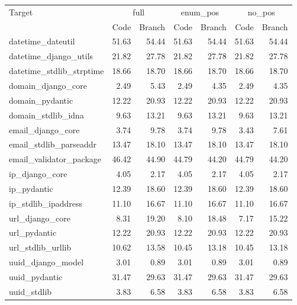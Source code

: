 \begin{tabular}{lrrrrrr}
\toprule
Target & \multicolumn{2}{c}{full} & \multicolumn{2}{c}{enum\_pos} & \multicolumn{2}{c}{no\_pos} \\
 & Code & Branch & Code & Branch & Code & Branch \\
\midrule
datetime\_dateutil & 51.63 & 54.44 & 51.63 & 54.44 & 51.63 & 54.44 \\
datetime\_django\_utils & 21.82 & 27.78 & 21.82 & 27.78 & 21.82 & 27.78 \\
datetime\_stdlib\_strptime & 18.66 & 18.70 & 18.66 & 18.70 & 18.66 & 18.70 \\
domain\_django\_core & 2.49 & 5.43 & 2.49 & 4.35 & 2.49 & 4.35 \\
domain\_pydantic & 12.22 & 20.93 & 12.22 & 20.93 & 12.22 & 20.93 \\
domain\_stdlib\_idna & 9.63 & 13.21 & 9.63 & 13.21 & 9.63 & 13.21 \\
email\_django\_core & 3.74 & 9.78 & 3.74 & 9.78 & 3.43 & 7.61 \\
email\_stdlib\_parseaddr & 13.47 & 18.10 & 13.47 & 18.10 & 13.47 & 18.10 \\
email\_validator\_package & 46.42 & 44.90 & 44.79 & 44.20 & 44.79 & 44.20 \\
ip\_django\_core & 4.05 & 2.17 & 4.05 & 2.17 & 4.05 & 2.17 \\
ip\_pydantic & 12.39 & 18.60 & 12.39 & 18.60 & 12.39 & 18.60 \\
ip\_stdlib\_ipaddress & 11.10 & 16.67 & 11.10 & 16.67 & 11.10 & 16.67 \\
url\_django\_core & 8.31 & 19.20 & 8.10 & 18.48 & 7.17 & 15.22 \\
url\_pydantic & 12.22 & 20.93 & 12.22 & 20.93 & 12.22 & 20.93 \\
url\_stdlib\_urllib & 10.62 & 13.58 & 10.45 & 13.18 & 10.45 & 13.18 \\
uuid\_django\_model & 3.01 & 0.89 & 3.01 & 0.89 & 3.01 & 0.89 \\
uuid\_pydantic & 31.47 & 29.63 & 31.47 & 29.63 & 31.47 & 29.63 \\
uuid\_stdlib & 3.83 & 6.58 & 3.83 & 6.58 & 3.83 & 6.58 \\
\bottomrule
\end{tabular}
